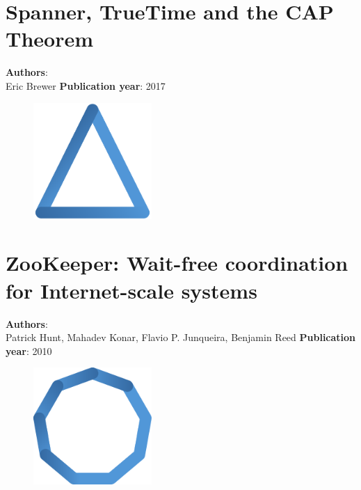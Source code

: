 \documentclass[11pt,fleqn]{book} %
\begin{document}
\chapter{Spanner, TrueTime and the CAP Theorem}
\vspace*{-7mm}
\Large \textbf{Authors}: \\
Eric Brewer
\newline\newline
\textbf{Publication year}: 2017
\begin{figure}[b]
    \centering
    \includegraphics[width=0.4\textwidth]{distributed-systems-triangle-blue.pdf}
\end{figure}



\chapter{ZooKeeper: Wait-free coordination for Internet-scale systems}
\vspace*{-7mm}
\Large \textbf{Authors}: \\
Patrick Hunt, Mahadev Konar, Flavio P. Junqueira, Benjamin Reed
\newline\newline
\textbf{Publication year}: 2010
\begin{figure}[b]
    \centering
    \includegraphics[width=0.4\textwidth]{distributed-systems-blue.pdf}
\end{figure}

\end{document}
